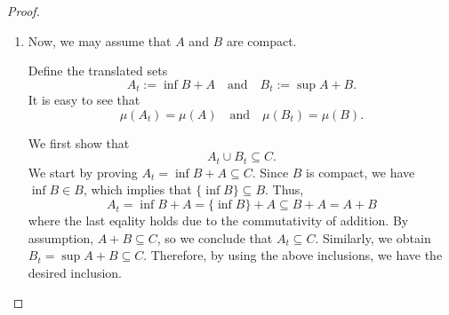 \begin{proof}
\begin{enumerate}
\begin{enumerate}
            Finally, we obtain
            \begin{equation}
                \mu(A_\epsilon) + \mu(B_\epsilon) \leq \mu(C)
                \label{eqn: BM for cpt}
            \end{equation}
            for non-empty measurable compact sets \(A_\epsilon\) and \(B_\epsilon\) with finite measure.

            Therefore, we conclude that 
            \begin{equation*}
                \mu(A) + \mu(B) < \mu(A_\epsilon) + \mu(B_\epsilon) + \epsilon \leq \mu(C) + \epsilon
            \end{equation*}
            where the first inequality holds from (\ref{eqn: volA bdd by Ae}) and (\ref{eqn: volB bdd by Be}) and the second follows from (\ref{eqn: BM for cpt}).
            Since this argument holds for any fixed \(\epsilon>0\), the proof is completed.

            \item Now, we may assume that \(A\) and \(B\) are compact.
            
            Define the translated sets 
            \begin{equation*}
                A_t := \inf B + A \quad \text{and} \quad B_t := \sup A + B.
            \end{equation*}
            It is easy to see that 
            \begin{equation*}
                \mu(A_t) = \mu(A) \quad \text{and} \quad \mu(B_t) = \mu(B).
            \end{equation*}

            We first show that 
            \begin{equation}
                A_t \cup B_t \subseteq C.
                \label{eqn: union At Bt included in C}
            \end{equation}
            We start by proving \(A_t = \inf B + A \subseteq C\). 
            Since \(B\) is compact, we have \(\inf B \in B\), which implies that \(\{\inf B\} \subseteq B\).
            Thus, 
            \begin{equation*}
                A_t = \inf B + A = \{\inf B\} + A \subseteq B + A = A + B
            \end{equation*}
            where the last eqality holds due to the commutativity of addition. 
            By assumption, \(A + B \subseteq C\), so we conclude that \(A_t \subseteq C\).
            Similarly, we obtain \(B_t = \sup A + B \subseteq C\).
            Therefore, by using the above inclusions, we have the desired inclusion.
            

\end{enumerate}
\end{enumerate}
\end{proof}
